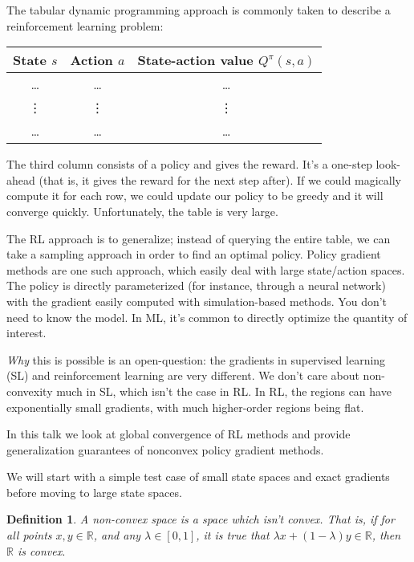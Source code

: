 \documentclass[12pt,reqno]{amsart}
\newtheorem{defn}{Definition}
\begin{document}
The tabular dynamic programming approach is commonly taken to describe a reinforcement learning problem:
\newline
\begin{tabular}{|c|c|c|}
\hline
State $s$ & Action $a$ & State-action value $Q^{\pi}(s,a)$ \\
\hline
\ldots & \ldots & \ldots \\
\hline
\vdots & \vdots & \vdots \\
\hline
\ldots & \ldots & \ldots \\
\hline
\end{tabular}
\newline
	The third column consists of a policy and gives the reward. It's a one-step look-ahead (that is, it gives the reward for the next step after). If we could magically compute it for each row, we could update our policy to be greedy and it will converge quickly. Unfortunately, the table is very large.

The RL approach is to generalize; instead of querying the entire table, we can take a sampling approach in order to find an optimal policy. Policy gradient methods are one such approach, which easily deal with large state/action spaces. The policy is directly parameterized (for instance, through a neural network) with the gradient easily computed with simulation-based methods. You don't need to know the model. In ML, it's common to directly optimize the quantity of interest. 

\textit{Why} this is possible is an open-question: the gradients in supervised learning (SL) and reinforcement learning are very different. We don't care about non-convexity much in SL, which isn't the case in RL. In RL, the regions can have exponentially small gradients, with much higher-order regions being flat.

In this talk we look at global convergence of RL methods and provide generalization guarantees of nonconvex policy gradient methods.

We will start with a simple test case of small state spaces and exact gradients before moving to large state spaces.

\begin{shaded}
\begin{defn}
A non-convex space is a space which isn't convex. That is, if for all points $x,y \in \mathbb{R}$, and any $\lambda \in [0,1]$, it is true that $\lambda x + (1-\lambda)y \in \mathbb{R}$, then $\mathbb{R}$ is convex.
\end{defn}
\end{shaded}
\end{document}
